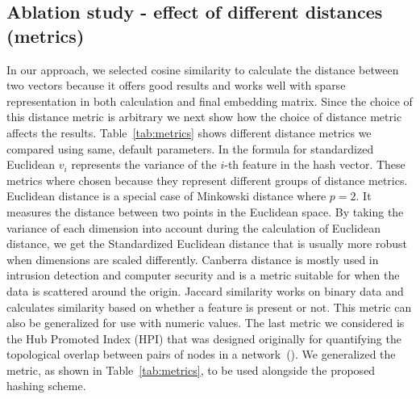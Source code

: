 \documentclass[twoside,11pt]{article}
\begin{document}
\subsection{Ablation study - effect of different distances (metrics)}
\label{sec:distances}
In our approach, we selected cosine similarity to calculate the distance between two vectors because it offers good results and works well with sparse representation in both calculation and final embedding matrix. Since the choice of this distance metric is arbitrary we next show how the choice of distance metric affects the results. Table~\ref{tab:metrics} shows different distance metrics we compared using same, default parameters. In the formula for standardized Euclidean $v_i$ represents the variance of the $i$-th feature in the hash vector. These metrics where chosen because they represent different groups of distance metrics. Euclidean distance is a special case of Minkowski distance where $p=2$. It measures the distance between two points in the Euclidean space. By taking the variance of each dimension into account during the calculation of Euclidean distance, we get the Standardized Euclidean distance that is usually more robust when dimensions are scaled differently. Canberra distance is mostly used in intrusion detection and computer security and is a metric suitable for when the data is scattered around the origin. Jaccard similarity works on binary data and calculates similarity based on whether a feature is present or not. This metric can also be generalized for use with numeric values. The last metric we considered is the Hub Promoted Index (HPI) that was designed originally for quantifying the topological overlap between pairs of nodes in a network~(\cite{zhou2009hpi}). We generalized the metric, as shown in Table~\ref{tab:metrics}, to be used alongside the proposed hashing scheme.
\end{document}

